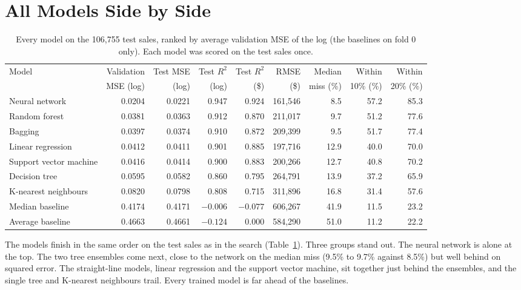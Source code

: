 \documentclass[sigconf,nonacm,10pt]{acmart}
\begin{document}
\section{All Models Side by Side}
\label{sec:all}

\begin{table}[t]
\caption{Every model on the 106,755 test sales, ranked by average validation MSE of the log (the baselines on fold 0 only). Each model was scored on the test sales once.}
\label{tab:test}
\small
\begin{tabular}{@{}lrrrrrrrr@{}}
\toprule
Model & Validation & Test MSE & Test $R^2$ & Test $R^2$ & RMSE & Median & Within & Within \\
 & MSE (log) & (log) & (log) & (\$) & (\$) & miss (\%) & 10\% (\%) & 20\% (\%) \\
\midrule
Neural network & 0.0204 & 0.0221 & 0.947 & 0.924 & 161,546 & 8.5 & 57.2 & 85.3 \\
Random forest & 0.0381 & 0.0363 & 0.912 & 0.870 & 211,017 & 9.7 & 51.2 & 77.6 \\
Bagging & 0.0397 & 0.0374 & 0.910 & 0.872 & 209,399 & 9.5 & 51.7 & 77.4 \\
Linear regression & 0.0412 & 0.0411 & 0.901 & 0.885 & 197,716 & 12.9 & 40.0 & 70.0 \\
Support vector machine & 0.0416 & 0.0414 & 0.900 & 0.883 & 200,266 & 12.7 & 40.8 & 70.2 \\
Decision tree & 0.0595 & 0.0582 & 0.860 & 0.795 & 264,791 & 13.9 & 37.2 & 65.9 \\
K-nearest neighbours & 0.0820 & 0.0798 & 0.808 & 0.715 & 311,896 & 16.8 & 31.4 & 57.6 \\
Median baseline & 0.4174 & 0.4171 & $-0.006$ & $-0.077$ & 606,267 & 41.9 & 11.5 & 23.2 \\
Average baseline & 0.4663 & 0.4661 & $-0.124$ & 0.000 & 584,290 & 51.0 & 11.2 & 22.2 \\
\bottomrule
\end{tabular}
\end{table}

The models finish in the same order on the test sales as in the search (Table~\ref{tab:test}). Three groups stand out. The neural network is alone at the top. The two tree ensembles come next, close to the network on the median miss (9.5\% to 9.7\% against 8.5\%) but well behind on squared error. The straight-line models, linear regression and the support vector machine, sit together just behind the ensembles, and the single tree and K-nearest neighbours trail. Every trained model is far ahead of the baselines.
\end{document}
